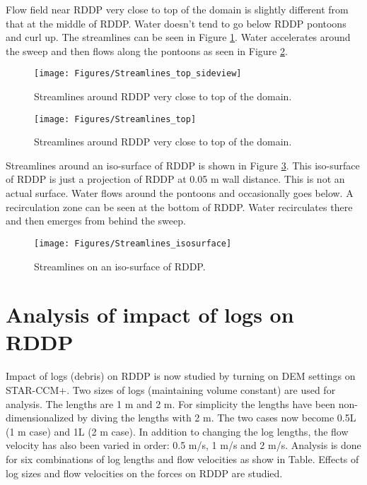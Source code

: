 \noindent Flow field near RDDP very close to top of the domain is slightly different from that at the middle of RDDP. Water doesn't tend to go below RDDP pontoons and curl up. The streamlines can be seen in Figure \ref{fig:Streamlines_top_sideview}. Water accelerates around the sweep and then flows along the pontoons as seen in Figure \ref{fig:Streamlines_top}. 

\begin{figure}
\centering
\texttt{[image: Figures/Streamlines\_top\_sideview]}
\caption{\label{fig:Streamlines_top_sideview}Streamlines around RDDP very close to top of the domain.}
\end{figure}

\begin{figure}
\centering
\texttt{[image: Figures/Streamlines\_top]}
\caption{\label{fig:Streamlines_top}Streamlines around RDDP very close to top of the domain.}
\end{figure}

\noindent Streamlines around an iso-surface of RDDP is shown in Figure \ref{fig:Streamlines_isosurface}. This iso-surface of RDDP is just a projection of RDDP at 0.05 m wall distance. This is not an actual surface. Water flows around the pontoons and occasionally goes below. A recirculation zone can be seen at the bottom of RDDP. Water recirculates there and then emerges from behind the sweep.\\

\begin{figure}
\centering
\texttt{[image: Figures/Streamlines\_isosurface]}
\caption{\label{fig:Streamlines_isosurface}Streamlines on an iso-surface of RDDP.}
\end{figure} 

\newpage
\section{Analysis of impact of logs on RDDP}
Impact of logs (debris) on RDDP is now studied by turning on DEM settings on STAR-CCM+. Two sizes of logs (maintaining volume constant) are used for analysis. The lengths are 1 m and 2 m. For simplicity the lengths have been non-dimensionalized by diving the lengths with 2 m. The two cases now become 0.5L (1 m case) and 1L (2 m case). In addition to changing the log lengths, the flow velocity has also been varied in order: 0.5 m/s, 1 m/s and 2 m/s. Analysis is done for six combinations of log lengths and flow velocities as show in Table. Effects of log sizes and flow velocities on the forces on RDDP are studied.

